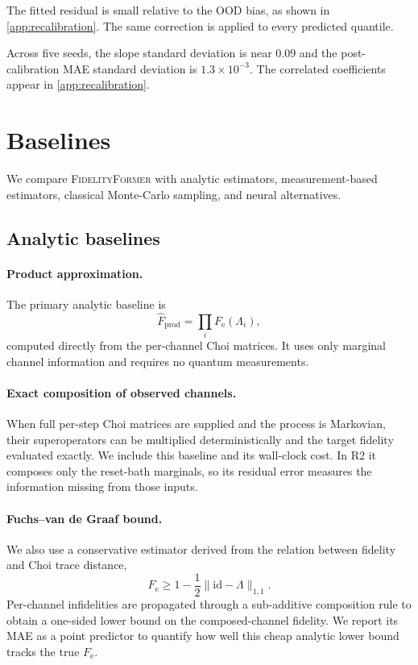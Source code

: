 \documentclass[12pt]{iopart}
\newcommand{\Fe}{F_{\mathrm{e}}}
\newcommand{\Fhat}{\widehat{F}}
\newcommand{\Lset}{\Lambda}
\newcommand{\fidno}{\textsc{FidelityFormer}}
\begin{document}
The fitted residual is small relative to the OOD bias, as shown in \ref{app:recalibration}. The same correction is applied to every predicted quantile.

Across five seeds, the slope standard deviation is near $0.09$ and the post-calibration MAE standard deviation is $1.3\times10^{-3}$. The correlated coefficients appear in \ref{app:recalibration}.


\section{Baselines}
\label{sec:baselines}

We compare \fidno{} with analytic estimators, measurement-based estimators, classical Monte-Carlo sampling, and neural alternatives.

\subsection{Analytic baselines}

\paragraph*{Product approximation.}
The primary analytic baseline is
\begin{equation}
\Fhat_{\mathrm{prod}}=\prod_i \Fe(\Lset_i),
\label{eq:product_approx}
\end{equation}
computed directly from the per-channel Choi matrices. It uses only marginal channel information and requires no quantum measurements.

\paragraph*{Exact composition of observed channels.}
When full per-step Choi matrices are supplied and the process is Markovian, their superoperators can be multiplied deterministically and the target fidelity evaluated exactly. We include this baseline and its wall-clock cost. In R2 it composes only the reset-bath marginals, so its residual error measures the information missing from those inputs.

\paragraph*{Fuchs--van de Graaf bound.}
We also use a conservative estimator derived from the relation between fidelity and Choi trace distance,
\[
\Fe \geq 1-\frac{1}{2}\|\mathrm{id}-\Lset\|_{1,1}.
\]
Per-channel infidelities are propagated through a sub-additive composition rule to obtain a one-sided lower bound on the composed-channel fidelity. We report its MAE as a point predictor to quantify how well this cheap analytic lower bound tracks the true $\Fe$.
\end{document}
